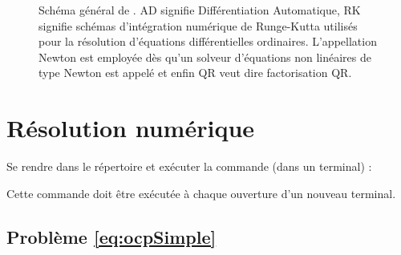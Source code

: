 \begin{figure}[ht!]
    \caption{
        Sch\'ema g\'en\'eral de \hampath.
        AD signifie Diff\'erentiation Automatique, RK signifie sch\'emas d'int\'egration num\'erique de Runge-Kutta
        utilis\'es pour la r\'esolution d'\'equations diff\'erentielles ordinaires. L'appellation Newton est employ\'ee
        d\`es qu'un solveur d'\'equations non lin\'eaires de type Newton est appel\'e et enfin QR veut dire factorisation QR.
    }
    \label{fig:schema}
    \end{figure}




\section{R\'esolution num\'erique}

\begin{myremark} Se rendre dans le r\'epertoire  et ex\'ecuter la commande (dans un terminal) :
    \begin{center}
    \end{center}
    Cette commande doit \^etre ex\'ecut\'ee \`a chaque ouverture d'un nouveau terminal.
\end{myremark}

\subsection{Probl\`eme \eqref{eq:ocpSimple}}

